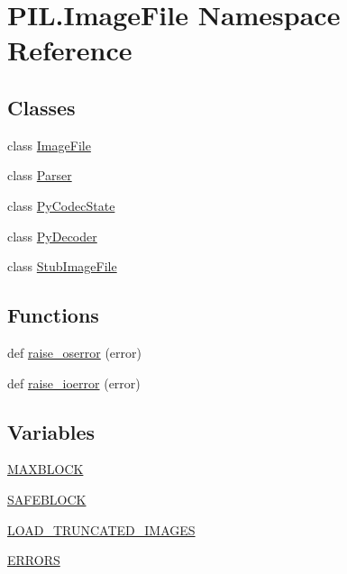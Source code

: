 \hypertarget{namespacePIL_1_1ImageFile}{}\section{P\+I\+L.\+Image\+File Namespace Reference}
\label{namespacePIL_1_1ImageFile}
\subsection*{Classes}
\begin{DoxyCompactItemize}
\item 
class \hyperlink{classPIL_1_1ImageFile_1_1ImageFile}{Image\+File}
\item 
class \hyperlink{classPIL_1_1ImageFile_1_1Parser}{Parser}
\item 
class \hyperlink{classPIL_1_1ImageFile_1_1PyCodecState}{Py\+Codec\+State}
\item 
class \hyperlink{classPIL_1_1ImageFile_1_1PyDecoder}{Py\+Decoder}
\item 
class \hyperlink{classPIL_1_1ImageFile_1_1StubImageFile}{Stub\+Image\+File}
\end{DoxyCompactItemize}
\subsection*{Functions}
\begin{DoxyCompactItemize}
\item 
def \hyperlink{namespacePIL_1_1ImageFile_a57b8bc228a04221cbafaf01e5b308473}{raise\+\_\+oserror} (error)
\item 
def \hyperlink{namespacePIL_1_1ImageFile_a9c23608b3027b00309e94581d036d82d}{raise\+\_\+ioerror} (error)
\end{DoxyCompactItemize}
\subsection*{Variables}
\begin{DoxyCompactItemize}
\item 
\hyperlink{namespacePIL_1_1ImageFile_a7b3fd4d65d86f4b9da0a83739605c849}{M\+A\+X\+B\+L\+O\+CK}
\item 
\hyperlink{namespacePIL_1_1ImageFile_adf6b6e8e1bc60b5c86348a1c0ecdd27c}{S\+A\+F\+E\+B\+L\+O\+CK}
\item 
\hyperlink{namespacePIL_1_1ImageFile_a96040b8f0f4055133b6f6f399716bb58}{L\+O\+A\+D\+\_\+\+T\+R\+U\+N\+C\+A\+T\+E\+D\+\_\+\+I\+M\+A\+G\+ES}
\item 
\hyperlink{namespacePIL_1_1ImageFile_a4f0af2211e9560dd67fc24d1b328add8}{E\+R\+R\+O\+RS}
\end{DoxyCompactItemize}


